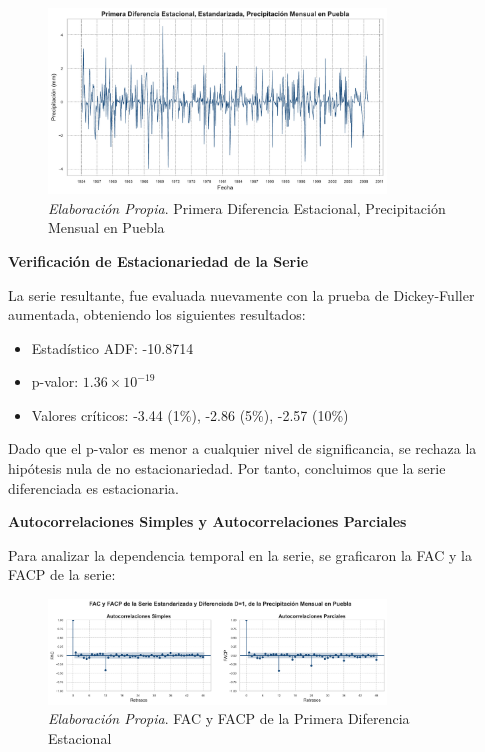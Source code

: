 \documentclass[12pt,letterpaper]{article}   %
\begin{document}
\begin{figure}[ht]
    \centering
    \includegraphics[width=0.8\textwidth]{imagenes/03-01-primera-diferencia-estacional-precipitacion.pdf}
    \caption{\textit{Elaboración Propia}. Primera Diferencia Estacional, Precipitación Mensual en Puebla}
\end{figure}


\textbf{Verificación de Estacionariedad de la Serie}

La serie resultante, fue evaluada nuevamente con la prueba de Dickey-Fuller aumentada, obteniendo los siguientes resultados:

\begin{itemize}
    \item Estadístico ADF: -10.8714
    \item p-valor: $1.36 \times 10^{-19}$
    \item Valores críticos: -3.44 (1\%), -2.86 (5\%), -2.57 (10\%)
\end{itemize}

Dado que el p-valor es menor a cualquier nivel de significancia, se rechaza la hipótesis nula de no estacionariedad. Por tanto, concluimos que la serie diferenciada es estacionaria. 

\textbf{Autocorrelaciones Simples y Autocorrelaciones Parciales
}

Para analizar la dependencia temporal en la serie, se graficaron la FAC y la FACP de la serie:

\begin{figure}[ht]
    \centering
    \includegraphics[width=0.8\textwidth]{imagenes/03-02-fac-facp-serie-D1.pdf}
    \caption{\textit{Elaboración Propia}. FAC y FACP de la Primera Diferencia Estacional}
\end{figure}
\end{document}
